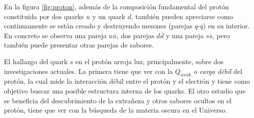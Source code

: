 En la figura \ref{fig:proton}, además de la composición fundamental del protón constituida por dos quarks $u$ y un quark $d$, también pueden apreciarse como continuamente se están creado y destruyendo mesones (parejas $q$-$\overline{q}$) en su interior. En concreto se observa una pareja $u\overline{u}$, dos parejas $d\overline{d}$ y una pareja $s\overline{s}$, pero también puede presentar otras parejas de sabores. 

El hallazgo del quark $s$ en el protón arroja luz, principalmente, sobre dos investigaciones actuales. La primera tiene que ver con la $Q_{weak}$ o \textit{carga débil} del protón, la cual mide la  interacción débil entre el protón y el electrón y tiene como objetivo buscar una posible estructura interna de los quarks. El otro estudio que se beneficia del descubrimiento de la extrañeza y otros sabores ocultos en el protón, tiene que ver con la búsqueda de la materia oscura en el Universo. 

